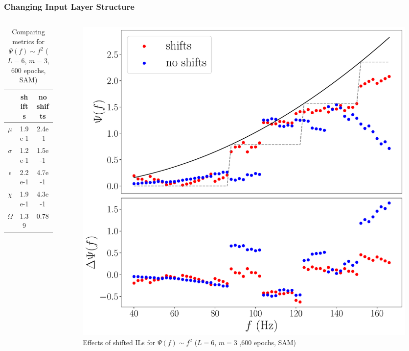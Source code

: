 \documentclass{beamer}
\begin{document}
\begin{frame}
\frametitle{Changing Input Layer Structure}
\begin{columns}
\begin{column}{0.5\textwidth}
\begin{table}
\begin{tabular}{c || c| c }
& shifts & no shifts \\ \hline \hline 
$\mu$ & 1.9e-1 & 2.4e-1   \\
$\sigma$ & 1.2e-1 & 1.5e-1  \\
$\epsilon$  & 2.2e-1 & 4.7e-1 \\
$\chi$ & 1.9e-1 & 4.3e-1 \\ \hline 
$\Omega$ & 1.39 &  0.78 
\end{tabular}
\caption{Comparing metrics for $\Psi(f) \sim f^2$ ($L=6$, $m=3$, 600 epochs, SAM)}
\end{table}
\end{column}
\begin{column}{0.5\textwidth}
\begin{figure}
\centering 
\includegraphics[width=\textwidth]{im/phase_shift_comp_quadratic_m3}
\caption{Effects of shifted ILs for $\Psi(f) \sim f^2$ ($L=6$, $m=3$ ,600 epochs, SAM)}
\end{figure}
\end{column}
\end{columns}
\end{frame}
\end{document}
